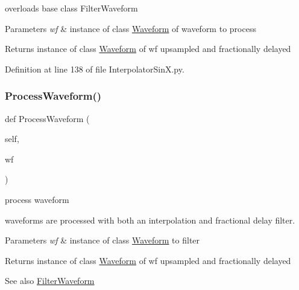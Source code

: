 overloads base class Filter\+Waveform 


\begin{DoxyParams}{Parameters}
{\em wf} & instance of class \hyperlink{namespaceSignalIntegrity_1_1TimeDomain_1_1Waveform}{Waveform} of waveform to process \\
\hline
\end{DoxyParams}
\begin{DoxyReturn}{Returns}
instance of class \hyperlink{namespaceSignalIntegrity_1_1TimeDomain_1_1Waveform}{Waveform} of wf upsampled and fractionally delayed 
\end{DoxyReturn}


Definition at line 138 of file Interpolator\+Sin\+X.\+py.

\mbox{\label{classSignalIntegrity_1_1TimeDomain_1_1Filters_1_1InterpolatorSinX_1_1InterpolatorFractionalDelayFilterSinX_ae09bec195c9cb1d5819e73b7be169b11}} 
\subsubsection{\texorpdfstring{Process\+Waveform()}{ProcessWaveform()}}
{\footnotesize\ttfamily def Process\+Waveform (\begin{DoxyParamCaption}\item[{}]{self,  }\item[{}]{wf }\end{DoxyParamCaption})}



process waveform 

waveforms are processed with both an interpolation and fractional delay filter.


\begin{DoxyParams}{Parameters}
{\em wf} & instance of class \hyperlink{namespaceSignalIntegrity_1_1TimeDomain_1_1Waveform}{Waveform} to filter \\
\hline
\end{DoxyParams}
\begin{DoxyReturn}{Returns}
instance of class \hyperlink{namespaceSignalIntegrity_1_1TimeDomain_1_1Waveform}{Waveform} of wf upsampled and fractionally delayed
\end{DoxyReturn}
\begin{DoxySeeAlso}{See also}
\hyperlink{classSignalIntegrity_1_1TimeDomain_1_1Filters_1_1InterpolatorSinX_1_1InterpolatorFractionalDelayFilterSinX_a84e73c18250ca4a61482f94ad61e735b}{Filter\+Waveform} 
\end{DoxySeeAlso}


